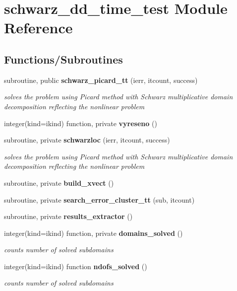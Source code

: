 \section{schwarz\+\_\+dd\+\_\+time\+\_\+test Module Reference}
\label{namespaceschwarz__dd__time__test}
\subsection*{Functions/\+Subroutines}
\begin{DoxyCompactItemize}
\item 
subroutine, public {\bf schwarz\+\_\+picard\+\_\+tt} (ierr, itcount, success)
\begin{DoxyCompactList}\small\item\em solves the problem using Picard method with Schwarz multiplicative domain decomposition reflecting the nonlinear problem \end{DoxyCompactList}\item 
integer(kind=ikind) function, private {\bf vyreseno} ()
\item 
subroutine, private {\bf schwarzloc} (ierr, itcount, success)
\begin{DoxyCompactList}\small\item\em solves the problem using Picard method with Schwarz multiplicative domain decomposition reflecting the nonlinear problem \end{DoxyCompactList}\item 
subroutine, private {\bf build\+\_\+xvect} ()
\item 
subroutine, private {\bf search\+\_\+error\+\_\+cluster\+\_\+tt} (sub, itcount)
\item 
subroutine, private {\bf results\+\_\+extractor} ()
\item 
integer(kind=ikind) function, private {\bf domains\+\_\+solved} ()
\begin{DoxyCompactList}\small\item\em counts number of solved subdomains \end{DoxyCompactList}\item 
integer(kind=ikind) function {\bf ndofs\+\_\+solved} ()
\begin{DoxyCompactList}\small\item\em counts number of solved subdomains \end{DoxyCompactList}\end{DoxyCompactItemize}


